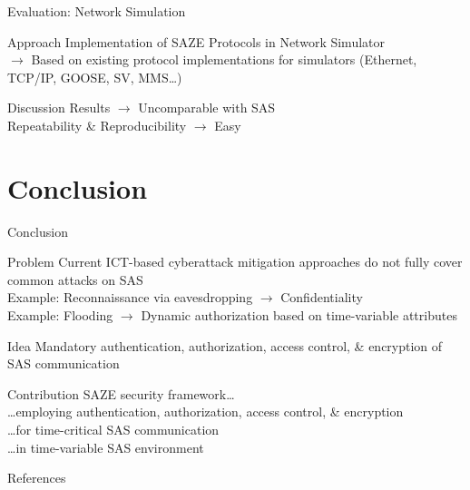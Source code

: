 \documentclass[en]{sdqbeamer}
\begin{document}
\begin{frame}{Evaluation: Network Simulation}
    \begin{greenblock}{Approach}
        Implementation of SAZE Protocols in Network Simulator
        \\$\rightarrow$ Based on existing protocol implementations for simulators (Ethernet, TCP/IP, GOOSE, SV, MMS\dots)
    \end{greenblock}
    \begin{blueblock}{Discussion}
        Results $\rightarrow$ Uncomparable with SAS
        \\Repeatability \& Reproducibility $\rightarrow$ Easy
    \end{blueblock}
\end{frame}

\section{Conclusion}
\begin{frame}{Conclusion}
    \begin{redblock}{Problem}
        Current ICT-based cyberattack mitigation approaches do not fully cover common attacks on SAS
        \\Example: Reconnaissance via eavesdropping $\rightarrow$ Confidentiality
        \\Example: Flooding $\rightarrow$ Dynamic authorization based on time-variable attributes
    \end{redblock}
    \begin{greenblock}{Idea}
        Mandatory authentication, authorization, access control, \& encryption of SAS communication
    \end{greenblock}
    \begin{blueblock}{Contribution}
        SAZE security framework\dots
        \\\dots employing authentication, authorization, access control, \& encryption
        \\\dots for time-critical SAS communication
        \\\dots in time-variable SAS environment
    \end{blueblock}
\end{frame}

\appendix
\beginbackup

\begin{frame}[allowframebreaks]{References}
\printbibliography
\end{frame}

\backupend
\end{document}
